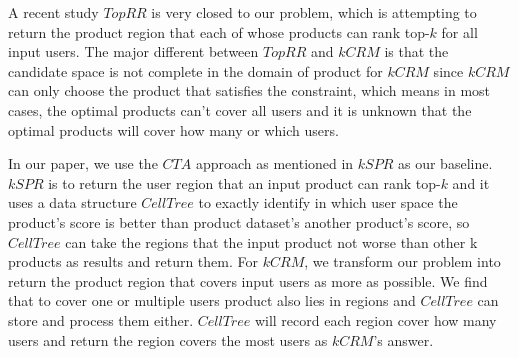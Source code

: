 A recent study $TopRR$\cite{tang_mouratidis_yiu_chen_2019} is very closed to our 
problem, which is attempting to return 
the product region that each of whose products can rank top-$k$ for all input users. 
The major different between $TopRR$ and $kCRM$ is that the candidate space is not complete 
in the domain of product for $kCRM$ since $kCRM$ can only choose the product that 
satisfies the constraint, 
which means in most cases, the optimal products can't cover all users and it is unknown
that the optimal products will cover how many or which users. 


In our paper, we use the $CTA$ approach as mentioned in $kSPR$ as our baseline. $kSPR$
is to return the user region that an input product can rank top-$k$ and it uses
a data structure $CellTree$ to exactly identify in which user space the product's score is
better than product dataset's another product's score, so $CellTree$ can take the regions that 
the input product not worse than other k products as results and return them. 
For $kCRM$, we transform our problem into return the product region that covers input users 
as more as possible. We find that to cover one or multiple users 
product also lies in regions and $CellTree$ can store and process them either. $CellTree$
will record each region cover how many users and return the region covers the most 
users as $kCRM$'s answer.   
 

 


